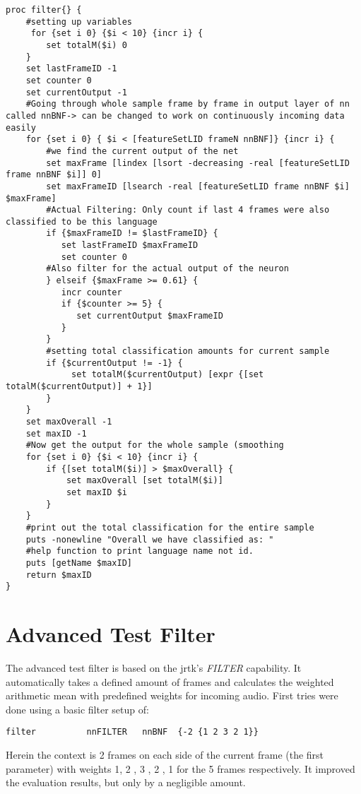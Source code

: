 \begin{lstlisting}[label=lst:basic,caption=Most basic filter employed to smooth output]
proc filter{} {
    #setting up variables
     for {set i 0} {$i < 10} {incr i} {
        set totalM($i) 0
    }
    set lastFrameID -1
    set counter 0
    set currentOutput -1
    #Going through whole sample frame by frame in output layer of nn called nnBNF-> can be changed to work on continuously incoming data easily
    for {set i 0} { $i < [featureSetLID frameN nnBNF]} {incr i} {
        #we find the current output of the net
        set maxFrame [lindex [lsort -decreasing -real [featureSetLID frame nnBNF $i]] 0]
        set maxFrameID [lsearch -real [featureSetLID frame nnBNF $i] $maxFrame]
        #Actual Filtering: Only count if last 4 frames were also classified to be this language
        if {$maxFrameID != $lastFrameID} {
           set lastFrameID $maxFrameID
           set counter 0
        #Also filter for the actual output of the neuron
        } elseif {$maxFrame >= 0.61} {
           incr counter
           if {$counter >= 5} {
              set currentOutput $maxFrameID
           }
        }
        #setting total classification amounts for current sample
        if {$currentOutput != -1} {
             set totalM($currentOutput) [expr {[set totalM($currentOutput)] + 1}]
        }
    }
    set maxOverall -1
    set maxID -1
    #Now get the output for the whole sample (smoothing
    for {set i 0} {$i < 10} {incr i} {
        if {[set totalM($i)] > $maxOverall} {
            set maxOverall [set totalM($i)]
            set maxID $i
        }
    }
    #print out the total classification for the entire sample
    puts -nonewline "Overall we have classified as: "
    #help function to print language name not id.
    puts [getName $maxID]
    return $maxID
}

\end{lstlisting}


\section{Advanced Test Filter}
\label{sec:eval:advanced}
The advanced test filter is based on the jrtk's \textit{FILTER} capability. It automatically takes a defined amount of frames and calculates the weighted arithmetic mean with predefined weights for incoming audio. First tries were done using a basic filter setup of:
\begin{verbatim}
filter          nnFILTER   nnBNF  {-2 {1 2 3 2 1}}
\end{verbatim}  Herein the context is 2 frames on each side of the current frame (the first parameter) with weights 1, 2 , 3 , 2 , 1 for the 5 frames respectively.  It improved the evaluation results, but only by a negligible amount.

